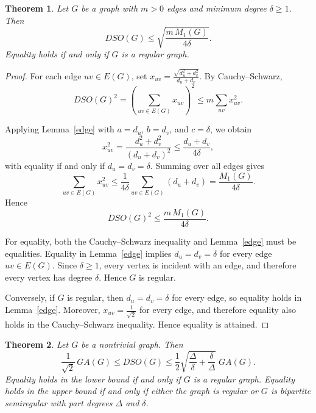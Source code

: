 \documentclass{article}
\newtheorem{theorem}{Theorem}
\theoremstyle{definition}
\begin{document}
\begin{theorem}\label{M1new}
Let $G$ be a graph with $m>0$ edges and minimum degree $\delta \ge 1$. Then
\[DSO(G) \le \sqrt{\frac{m\,M_1(G)}{4\delta}}.
\]
Equality holds if and only if $G$ is a regular graph.
\end{theorem}
\begin{proof}
For each edge $uv\in E(G)$, set
$
x_{uv} = \frac{\sqrt{d_u^2+d_v^2}}{d_u+d_v}.
$
By Cauchy–Schwarz,
\[
DSO(G)^2 = \left(\sum_{uv\in E(G)} x_{uv}\right)^2
\le m \sum_{uv} x_{uv}^2.
\]

Applying Lemma~\ref{edge} with $a=d_u$, $b=d_v$, and $c=\delta$, we obtain
\[
x_{uv}^2 = \frac{d_u^2+d_v^2}{(d_u+d_v)^2}
\le \frac{d_u+d_v}{4\delta},
\]
with equality if and only if $d_u=d_v=\delta$. Summing over all edges gives
\[
\sum_{uv\in E(G)} x_{uv}^2 \le \frac{1}{4\delta} \sum_{uv\in E(G)} (d_u+d_v)
= \frac{M_1(G)}{4\delta}.
\]
Hence
\[
DSO(G)^2 \le \frac{m\,M_1(G)}{4\delta}.
\]

For equality, both the Cauchy--Schwarz inequality and Lemma~\ref{edge}
must be equalities.
Equality in Lemma~\ref{edge} implies
$
d_u=d_v=\delta
$
for every edge $uv\in E(G)$.
Since $\delta\ge1$, every vertex is incident with an edge, and therefore every vertex has degree $\delta$.
Hence $G$ is regular.

Conversely, if $G$ is regular, then $d_u=d_v=\delta$ for every edge, so equality holds in Lemma~\ref{edge}. Moreover,
$
x_{uv}=\frac1{\sqrt2}
$
for every edge, and therefore equality also holds in the Cauchy--Schwarz inequality. Hence equality is attained.
\end{proof}






\begin{theorem}\label{t3.6}
Let $G$ be a nontrivial graph. Then
\[
\frac{1}{\sqrt{2}}\,GA(G) \le DSO(G) \le \frac{1}{2}\sqrt{\frac{\Delta}{\delta}+\frac{\delta}{\Delta}}\; GA(G).
\]
Equality holds in the lower bound if and only if $G$ is a regular graph.  
Equality holds in the upper bound if and only if either the graph is regular or $G$ is bipartite semiregular with part degrees $\Delta$ and $\delta$.
\end{theorem}
\end{document}
